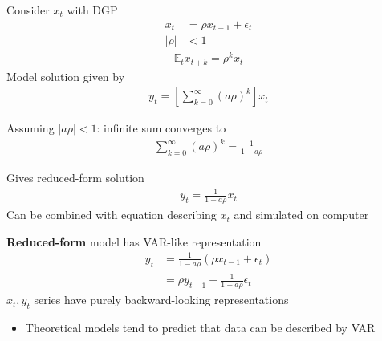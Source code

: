 \documentclass{beamer}
\begin{document}
\begin{frame}
 Consider $x_t$ with DGP  
\begin{align}
  x_t&=\rho x_{t-1} + \epsilon_t \\ \nonumber 
  |\rho| &< 1
\end{align}
\begin{align}
  \mathbb{E}_tx_{t+k}=\rho^kx_t
\end{align}
 Model solution given by
\begin{align}
  y_t=\left[ \sum^{\infty}_{k=0}(a\rho)^k \right]x_t
\end{align}
\end{frame}

\begin{frame} 
  Assuming $|a\rho|<1$: infinite sum converges to
  \begin{align}
  \sum^{\infty}_{k=0}(a\rho)^k=\frac{1}{1-a\rho}
\end{align}

Gives reduced-form solution
\begin{align}
  y_t=\frac{1}{1-a\rho}x_t
\end{align}
\medskip
Can be combined with equation describing $x_t$ and simulated on computer
\end{frame}

\begin{frame}
  \textbf{Reduced-form} model has VAR-like representation
  \begin{align}
  y_t &= \frac{1}{1-a\rho}(\rho x_{t-1}+\epsilon_t)\\
      &= \rho y_{t-1} +  \frac{1}{1-a\rho}\epsilon_t
  \end{align}
  \medskip
  $x_t,y_t$ series have purely backward-looking representations
  \begin{itemize}
    \item Theoretical models tend to predict that data can be described by VAR
  \end{itemize}
\end{frame}
\end{document}
